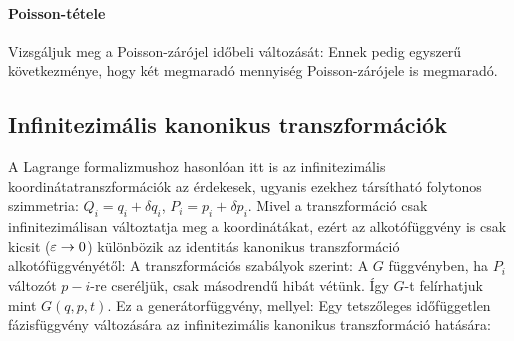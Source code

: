    \paragraph{Poisson-tétele}
   
   Vizsgáljuk meg a Poisson-zárójel időbeli változását:
   Ennek pedig egyszerű következménye, hogy két megmaradó mennyiség Poisson-zárójele is megmaradó.
   
  \subsection{Infinitezimális kanonikus transzformációk}
   
   A Lagrange formalizmushoz hasonlóan itt is az infinitezimális koordinátatranszformációk az érdekesek, ugyanis ezekhez társítható folytonos szimmetria: $Q_i=q_i+\delta q_i$, $P_i=p_i+\delta p_i$. Mivel a transzformáció csak infinitezimálisan változtatja meg a koordinátákat, ezért az alkotófüggvény is csak kicsit ($\varepsilon\to 0$) különbözik az identitás kanonikus transzformáció alkotófüggvényétől:
   A transzformációs szabályok szerint:
   A $G$ függvényben, ha $P_i$ változót $p-i$-re cseréljük, csak másodrendű hibát vétünk. Így $G$-t felírhatjuk mint $G(q,p,t)$. Ez a generátorfüggvény, mellyel:
   Egy tetszőleges időfüggetlen fázisfüggvény változására az infinitezimális kanonikus transzformáció hatására:
   
